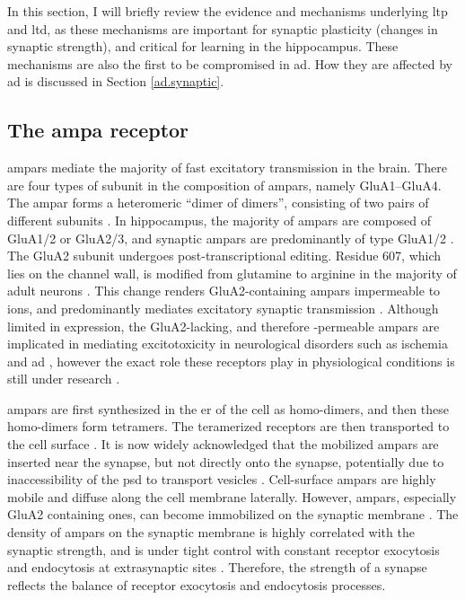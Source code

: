 In this section, I will briefly review the evidence and mechanisms underlying \gls{ltp} and \gls{ltd}, as these mechanisms are important for synaptic plasticity (changes in synaptic strength), and critical for learning in the hippocampus. These mechanisms are also the first to be compromised in \gls{ad}. How they are affected by \gls{ad} is discussed in Section \ref{ad.synaptic}. 

\subsection{The \gls{ampa} receptor}

\glspl{ampar} mediate the majority of fast excitatory transmission in the brain. There are four types of subunit in the composition of \glspl{ampar}, namely GluA1--GluA4. The \gls{ampar} forms a heteromeric ``dimer of dimers'', consisting of two pairs of different subunits \citep{ayalon01}. In hippocampus, the majority of \glspl{ampar} are composed of GluA1/2 or GluA2/3, and synaptic \glspl{ampar} are predominantly of type GluA1/2 \citep{wenthold96, lu09}. The GluA2 subunit undergoes post-transcriptional editing. Residue 607, which lies on the channel wall, is modified from glutamine to arginine in the majority of adult neurons \citep{greger03}. This change renders GluA2-containing \gls{ampar}s impermeable to  ions, and predominantly mediates excitatory synaptic transmission \citep{sommer91,swanson97}. Although limited in expression, the GluA2-lacking, and therefore -permeable \glspl{ampar} are implicated in mediating excitotoxicity in neurological disorders such as ischemia and \gls{ad} \citep{kwak06, whitehead17}, however the exact role these receptors play in physiological conditions is still under research \citep{whitehead17}.

\Glspl{ampar} are first synthesized in the \gls{er} of the cell as homo-dimers, and then these homo-dimers form tetramers. The teramerized receptors are then transported to the cell surface \citep{henley13}. It is now widely acknowledged that the mobilized \glspl{ampar} are inserted near the synapse, but not directly onto the synapse, potentially due to inaccessibility of the \gls{psd} to transport vesicles \citep{henley11, chater14}. Cell-surface \glspl{ampar} are highly mobile and diffuse along the cell membrane laterally. However, \glspl{ampar}, especially GluA2 containing ones, can become immobilized on the synaptic membrane \citep{borgdorff02, groc04}. The density of \glspl{ampar} on the synaptic membrane is highly correlated with the synaptic strength, and is under tight control with constant receptor exocytosis and endocytosis at extrasynaptic sites \citep{malinow02, henley11}. Therefore, the strength of a synapse reflects the balance of receptor exocytosis and endocytosis processes. 

